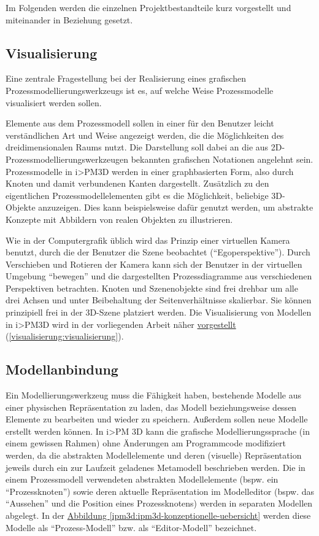 \documentclass[a4paper,10pt]{sphinxmanual}
\begin{document}
Im Folgenden werden die einzelnen Projektbestandteile kurz vorgestellt und miteinander in Beziehung gesetzt.


\subsection{Visualisierung}
\label{ipm3d:ipm3d-visualisierung}\label{ipm3d:visualisierung}
Eine zentrale Fragestellung bei der Realisierung eines grafischen Prozessmodellierungswerkzeugs ist es, auf welche Weise Prozessmodelle visualisiert werden sollen.

Elemente aus dem Prozessmodell sollen in einer für den Benutzer leicht verständlichen Art und Weise angezeigt werden, die die Möglichkeiten des dreidimensionalen Raums nutzt.
Die Darstellung soll dabei an die aus 2D-Prozessmodellierungswerkzeugen bekannten grafischen Notationen angelehnt sein.
Prozessmodelle in i\textgreater{}PM3D werden in einer graphbasierten Form, also durch Knoten und damit verbundenen Kanten dargestellt.
Zusätzlich zu den eigentlichen Prozessmodellelementen gibt es die Möglichkeit, beliebige 3D-Objekte anzuzeigen. Dies kann beispielsweise dafür genutzt werden, um abstrakte Konzepte mit Abbildern von realen Objekten zu illustrieren.

Wie in der Computergrafik üblich wird das Prinzip einer virtuellen Kamera benutzt, durch die der Benutzer die Szene beobachtet ("`Egoperspektive"').
Durch Verschieben und Rotieren der Kamera kann sich der Benutzer in der virtuellen Umgebung "`bewegen"' und die dargestellten Prozessdiagramme aus verschiedenen Perspektiven betrachten.
Knoten und Szenenobjekte sind frei drehbar um alle drei Achsen und unter Beibehaltung der Seitenverhältnisse skalierbar. Sie können prinzipiell frei in der 3D-Szene platziert werden.
Die Visualisierung von Modellen in i\textgreater{}PM3D wird in der vorliegenden Arbeit näher {\hyperref[visualisierung:visualisierung]{vorgestellt}} (\autoref*{visualisierung:visualisierung}).


\subsection{Modellanbindung}
\label{ipm3d:modellanbindung}
Ein Modellierungswerkzeug muss die Fähigkeit haben, bestehende Modelle aus einer physischen Repräsentation zu laden, das Modell beziehungsweise dessen Elemente zu bearbeiten und wieder zu speichern.
Außerdem sollen neue Modelle erstellt werden können.
In i\textgreater{}PM 3D kann die grafische Modellierungssprache (in einem gewissen Rahmen) ohne Änderungen am Programmcode modifiziert werden, da die abstrakten Modellelemente und deren (visuelle) Repräsentation jeweils durch ein zur Laufzeit geladenes Metamodell beschrieben werden.
Die in einem Prozessmodell verwendeten abstrakten Modellelemente (bspw. ein "`Prozessknoten"') sowie deren aktuelle Repräsentation im Modelleditor (bspw. das "`Aussehen"' und die Position eines Prozessknotens) werden in separaten Modellen abgelegt.
In der \hyperref[ipm3d:ipm3d-konzeptionelle-uebersicht]{Abbildung  \ref*{ipm3d:ipm3d-konzeptionelle-uebersicht}} werden diese Modelle als "`Prozess-Modell"' bzw. als "`Editor-Modell"' bezeichnet.
\end{document}
